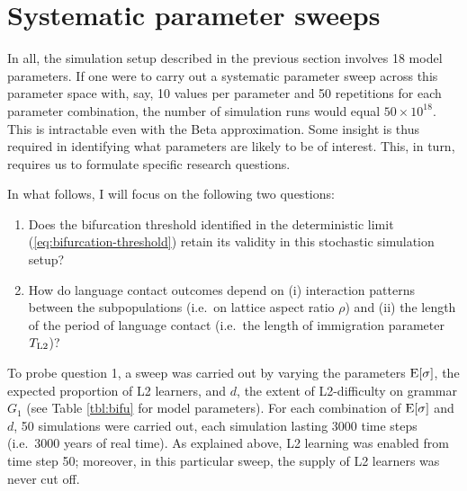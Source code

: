 \hypertarget{sec:sweeps}{%
\section{Systematic parameter sweeps}\label{sec:sweeps}}

In all, the simulation setup described in the previous section involves
18 model parameters. If one were to carry out a systematic parameter
sweep across this parameter space with, say, 10 values per parameter and
50 repetitions for each parameter combination, the number of simulation
runs would equal \(50 \times 10^{18}\). This is intractable even with
the Beta approximation. Some insight is thus required in identifying
what parameters are likely to be of interest. This, in turn, requires us
to formulate specific research questions.

In what follows, I will focus on the following two questions:

\begin{enumerate}
\def\labelenumi{\arabic{enumi}.}
\tightlist
\item
  Does the bifurcation threshold identified in the deterministic limit
  (\ref{eq:bifurcation-threshold}) retain its validity in this
  stochastic simulation setup?
\item
  How do language contact outcomes depend on (i) interaction patterns
  between the subpopulations (i.e.~on lattice aspect ratio \(\rho\)) and
  (ii) the length of the period of language contact (i.e.~the length of
  immigration parameter \(T_\textnormal{L2}\))?
\end{enumerate}

To probe question 1, a sweep was carried out by varying the parameters
\(\textnormal{E}[\sigma]\), the expected proportion of L2 learners, and
\(d\), the extent of L2-difficulty on grammar \(G_1\) (see Table
\ref{tbl:bifu} for model parameters). For each combination of
\(\textnormal{E}[\sigma]\) and \(d\), 50 simulations were carried out,
each simulation lasting 3000 time steps (i.e.~3000 years of real time).
As explained above, L2 learning was enabled from time step 50; moreover,
in this particular sweep, the supply of L2 learners was never cut off.

